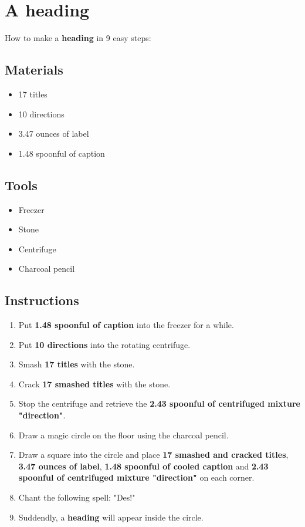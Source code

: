 \documentclass{article}
\begin{document}
\section{A heading}How to make a \textbf{heading} in 9 easy steps:

\subsection{Materials}\begin{itemize}
\item 
17 titles
\item 
10 directions
\item 
3.47 ounces of label
\item 
1.48 spoonful of caption
\end{itemize}
\subsection{Tools}\begin{itemize}
\item 
Freezer
\item 
Stone
\item 
Centrifuge
\item 
Charcoal pencil
\end{itemize}
\subsection{Instructions}\begin{enumerate}
\item 
Put \textbf{1.48 spoonful of caption} into the freezer for a while.
\item 
Put \textbf{10 directions} into the rotating centrifuge.
\item 
Smash \textbf{17 titles} with the stone.
\item 
Crack \textbf{17 smashed titles} with the stone.
\item 
Stop the centrifuge and retrieve the \textbf{2.43 spoonful of centrifuged mixture "direction"}.
\item 
Draw a magic circle on the floor using the charcoal pencil.
\item 
Draw a square into the circle and place \textbf{17 smashed and cracked titles}, \textbf{3.47 ounces of label}, \textbf{1.48 spoonful of cooled caption} and \textbf{2.43 spoonful of centrifuged mixture "direction"} on each corner.
\item 
Chant the following spell: "Des!"
\item 
Suddendly, a \textbf{heading} will appear inside the circle.
\end{enumerate}
\newpage
\end{document}
